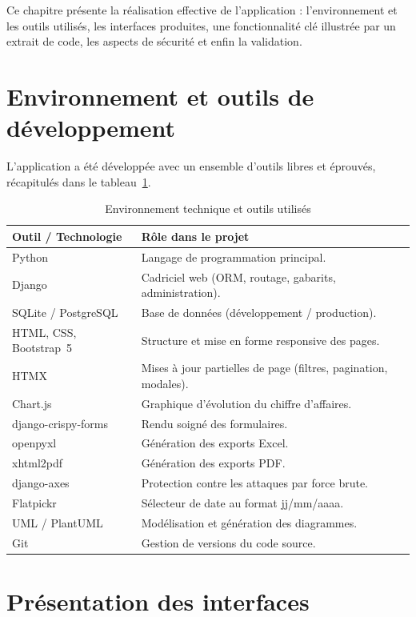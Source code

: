 Ce chapitre présente la réalisation effective de l'application : l'environnement et les outils utilisés, les interfaces produites, une fonctionnalité clé illustrée par un extrait de code, les aspects de sécurité et enfin la validation.

\section{Environnement et outils de développement}

L'application a été développée avec un ensemble d'outils libres et éprouvés, récapitulés dans le tableau~\ref{tab:outils}.

\begin{table}[H]
\centering
\caption{Environnement technique et outils utilisés}
\label{tab:outils}
\begin{tabular}{@{}p{4.2cm}p{9.8cm}@{}}
\toprule
\textbf{Outil / Technologie} & \textbf{Rôle dans le projet} \\
\midrule
Python & Langage de programmation principal. \\
Django & Cadriciel web (ORM, routage, gabarits, administration). \\
SQLite / PostgreSQL & Base de données (développement / production). \\
HTML, CSS, Bootstrap~5 & Structure et mise en forme responsive des pages. \\
HTMX & Mises à jour partielles de page (filtres, pagination, modales). \\
Chart.js & Graphique d'évolution du chiffre d'affaires. \\
django-crispy-forms & Rendu soigné des formulaires. \\
openpyxl & Génération des exports Excel. \\
xhtml2pdf & Génération des exports PDF. \\
django-axes & Protection contre les attaques par force brute. \\
Flatpickr & Sélecteur de date au format jj/mm/aaaa. \\
UML / PlantUML & Modélisation et génération des diagrammes. \\
Git & Gestion de versions du code source. \\
\bottomrule
\end{tabular}
\end{table}

\section{Présentation des interfaces}

